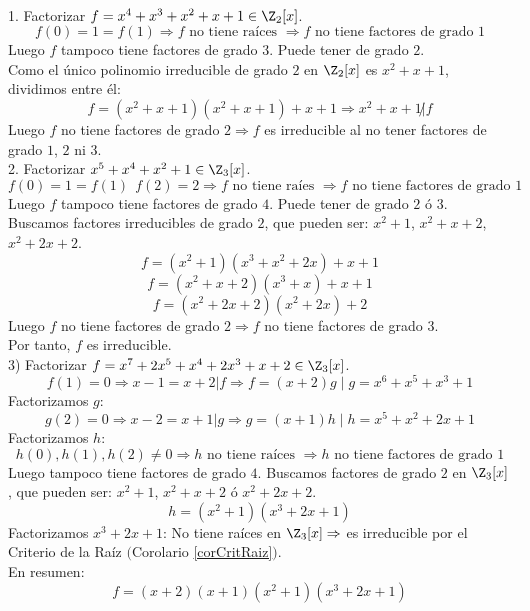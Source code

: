 \begin{ejemplo}
    \ \\
    1. Factorizar $f=x^4+x^3+x^2+x+1 \in \Z_2[x]$.
    $$f(0)=1=f(1) \Rightarrow f \mbox{ no tiene raíces } \Rightarrow f \mbox{ no tiene factores de grado } 1$$
    Luego $f$ tampoco tiene factores de grado $3$. Puede tener de grado $2$.\\

    
    Como el único polinomio irreducible de grado $2$ en $\Z_2[x]$ es $x^2+x+1$, dividimos entre él:
    $$f=(x^2+x+1)(x^2+x+1)+x+1 \Rightarrow x^2+x+1\not|f$$
    Luego $f$ no tiene factores de grado $2 \Rightarrow f$ es irreducible al no tener factores de grado $1$, $2$ ni $3$.\\

    
    2. Factorizar $x^5+x^4+x^2+1 \in \Z_3[x]$.
    $$f(0) = 1 = f(1)~~f(2) = 2 \Rightarrow f \mbox{ no tiene raíes } \Rightarrow f \mbox{ no tiene factores de grado } 1$$
    Luego $f$ tampoco tiene factores de grado $4$. Puede tener de grado $2$ ó $3$.\\

    
    Buscamos factores irreducibles de grado $2$, que pueden ser: $x^2+1$, $x^2+x+2$, $x^2+2x+2$.
    $$f=(x^2+1)(x^3+x^2+2x)+x+1$$
    $$f=(x^2+x+2)(x^3+x)+x+1$$
    $$f=(x^2+2x+2)(x^2+2x)+2$$
    Luego $f$ no tiene factores de grado $2 \Rightarrow f$ no tiene factores de grado $3$.\\

    
    Por tanto, $f$ es irreducible.\\

    
    3) Factorizar $f=x^7+2x^5+x^4+2x^3+x+2 \in \Z_3[x]$.
    $$f(1)=0 \Rightarrow x-1 = x+2|f \Rightarrow f=(x+2)g \mid g=x^6+x^5+x^3+1$$
    Factorizamos $g$:
    $$g(2)=0 \Rightarrow x-2=x+1|g \Rightarrow g=(x+1)h \mid h = x^5+x^2+2x+1$$
    Factorizamos $h$:
    $$h(0),h(1),h(2) \neq 0 \Rightarrow h \mbox{ no tiene raíces } \Rightarrow h \mbox{ no tiene factores de grado } 1$$
    Luego tampoco tiene factores de grado $4$. Buscamos factores de grado $2$ en $\Z_3[x]$, que pueden ser:\newline
    $x^2+1$, $x^2+x+2$ ó $x^2+2x+2$.
    $$h=(x^2+1)(x^3+2x+1)$$
    Factorizamos $x^3+2x+1$:\newline
    No tiene raíces en $\Z_3[x] \Rightarrow $ es irreducible por el Criterio de la Raíz $($Corolario \ref{corCritRaiz}$)$.\\

    
    En resumen:
    $$f=(x+2)(x+1)(x^2+1)(x^3+2x+1)$$
\end{ejemplo}

